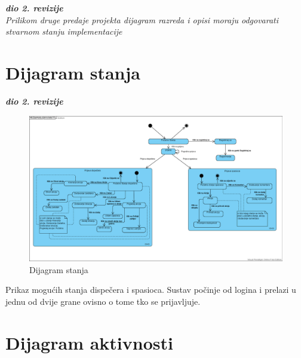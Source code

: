 			\textbf{\textit{dio 2. revizije}}\\			
			
			\textit{Prilikom druge predaje projekta dijagram razreda i opisi moraju odgovarati stvarnom stanju implementacije}
			
			
			
			\eject
		
		\section{Dijagram stanja}
			
			
			\textbf{\textit{dio 2. revizije}}\\
			
			\begin{figure}[H]
				\includegraphics[scale=0.32]{slike/stanja.PNG}
				\centering
				\caption{Dijagram stanja}
				\label{fig:dijagram_stanja}
			\end{figure}
			Prikaz mogućih stanja dispečera i spasioca. Sustav počinje od logina i prelazi u jednu od dvije grane ovisno o tome tko se prijavljuje.
			
			\eject 
		
		\section{Dijagram aktivnosti}
			
